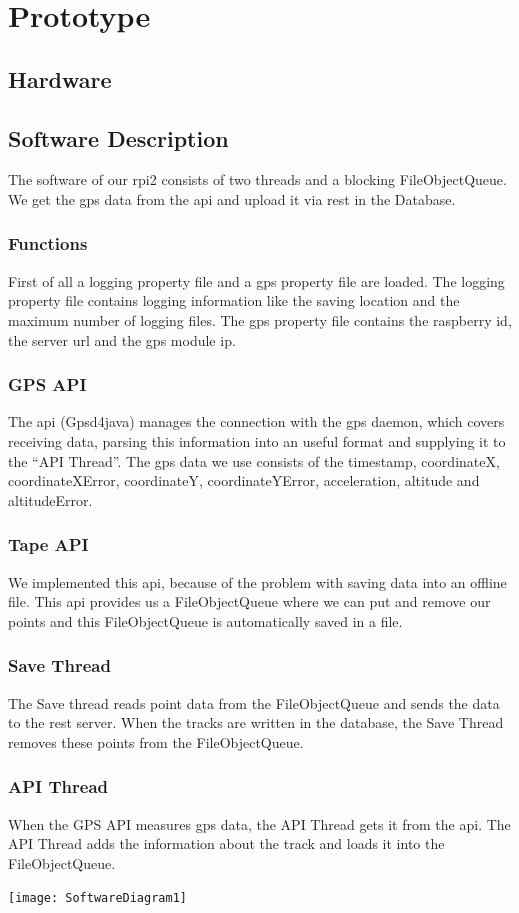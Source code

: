\setcounter{chapter}{0}
\chapter{Prototype}
\section{Hardware}
\newpage
\section{Software Description}
The software of our \gls{rpi2} consists of two threads and a blocking FileObjectQueue. We get the \gls{gps} data from the \gls{api} and upload it via \gls{rest} in the Database. 
\subsection{Functions}
First of all a logging property file and a gps property file are loaded. The logging property file contains logging information like the saving location and the maximum number of logging files. The gps property file contains the raspberry id, the server \gls{url} and the gps module \gls{ip}.
\subsection{GPS API}
The \gls{api} (Gpsd4java) manages the connection with the \gls{gps} daemon, which covers receiving data, parsing this information into an useful format and supplying it to the “API Thread”. The \gls{gps} data we use consists of the timestamp, coordinateX, coordinateXError, coordinateY, coordinateYError, acceleration, altitude and altitudeError.
\subsection{Tape API}
We implemented this \gls{api}, because of the problem with saving data into an offline file. This \gls{api} provides us a FileObjectQueue where we can put and remove our points and this FileObjectQueue is automatically saved in a file. 
\subsection{Save Thread}
The Save thread reads point data from the FileObjectQueue and sends the data to the \gls{rest} server. When the tracks are written in the database, the Save Thread removes these points from the FileObjectQueue.
\subsection{API Thread}
When the GPS API measures \gls{gps} data, the API Thread gets it from the \gls{api}. The API Thread adds the information about the track and loads it into the FileObjectQueue.
\begin{center}
\texttt{[image: SoftwareDiagram1]}
\end{center} 
